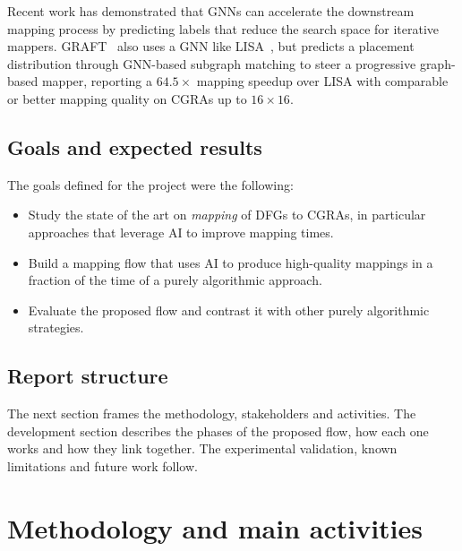 \documentclass[10pt]{article}
\begin{document}
Recent work has demonstrated that GNNs can accelerate the downstream mapping process by predicting labels that reduce the search space for iterative mappers. GRAFT~\cite{10416096} also uses a GNN like LISA~\cite{lisa2022}, but predicts a placement distribution through GNN-based subgraph matching to steer a progressive graph-based mapper, reporting a $64.5\times$ mapping speedup over LISA with comparable or better mapping quality on CGRAs up to $16\times16$.

\subsection{Goals and expected results}

The goals defined for the project were the following:

\begin{itemize}
	\item Study the state of the art on \textit{mapping} of DFGs to CGRAs, in particular approaches that leverage AI to improve mapping times.
	\item Build a mapping flow that uses AI to produce high-quality mappings in a fraction of the time of a purely algorithmic approach.
	\item Evaluate the proposed flow and contrast it with other purely algorithmic strategies.
\end{itemize}

\subsection{Report structure}

The next section frames the methodology, stakeholders and activities. The
development section describes the phases of the proposed flow, how each one works and how they link together. The experimental validation, known limitations and future work follow.




\section{Methodology and main activities}
\end{document}
